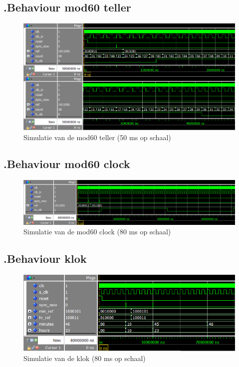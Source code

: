 \subsection*{\label{fig: mod601_beh}\thesubsection.\quad Behaviour mod60 teller}
\begin{figure}[ht!]
\includegraphics[width=\textwidth,height=\textheight,keepaspectratio]{Figuren/DCF77/Mod60_teller.png}
\caption{Simulatie van de mod60 teller (50 ms op schaal)}
\end{figure}
\subsection*{\label{fig: mod602_beh}\thesubsection.\quad Behaviour mod60 clock}
\begin{figure}[ht!]
\includegraphics[width=\textwidth,height=\textheight,keepaspectratio]{Figuren/DCF77/Mod60_clock.png}
\caption{Simulatie van de mod60 clock (80 ms op schaal)}
\end{figure}
\subsection*{\label{fig: klok_beh}\thesubsection.\quad Behaviour klok}
\begin{figure}[ht!]
\includegraphics[width=\textwidth,height=\textheight,keepaspectratio]{Figuren/DCF77/Klok.png}
\caption{Simulatie van de klok (80 ms op schaal)}
\end{figure}
